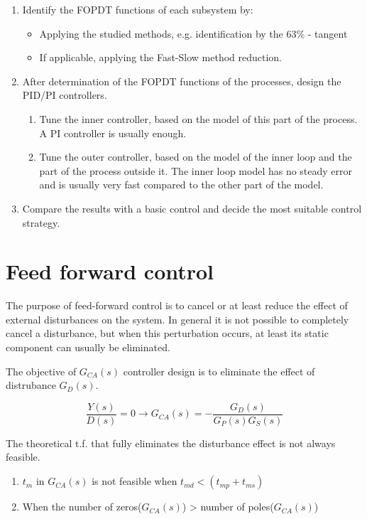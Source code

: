 \begin{enumerate}
    \item Identify the FOPDT functions of each subsystem by:
    \begin{itemize}
        \item Applying the studied methods, e.g. identification by the 63\% - tangent
        \item If applicable, applying the Fast-Slow method reduction.
    \end{itemize}
    \item After determination of the FOPDT functions of the processes, design the PID/PI controllers.
    \begin{enumerate}
        \item Tune the inner controller, based on the model of this part of the process. A PI controller is usually enough.
        \item Tune the outer controller, based on the model of the inner loop and the part of the process outside it. The inner loop model has no steady error and is usually very fast compared to the other part of the model.
    \end{enumerate}
    \item Compare the results with a basic control and decide the most suitable control strategy.
\end{enumerate}

\section{Feed forward control}
The purpose of feed-forward control is to cancel or at least reduce the effect of external disturbances on the system. In general it is not possible to completely cancel a disturbance, but when this perturbation occurs, at least its static component can usually be eliminated.

The objective of $G_{CA} (s)$ controller design is to eliminate the effect of distrubance $G_D (s)$.

\[ \frac{Y(s)}{D(s)} = 0 \rightarrow G_{CA} (s) = - \frac{G_D (s)}{G_P (s) G_S (s)} \]

The theoretical t.f. that fully eliminates the disturbance effect is not always feasible.
\begin{enumerate}
    \item $t_m$ in $G_{CA}(s)$ is not feasible when $t_{md} < (t_{mp} + t_{ms})$
    \item When the number of zeros($G_{CA} (s)$) > number of poles($G_{CA}(s)$)
\end{enumerate}

